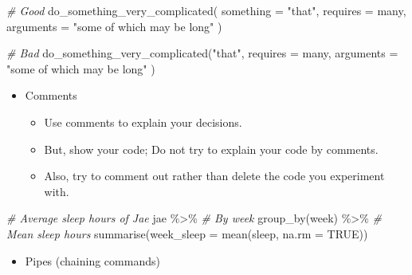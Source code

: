 \documentclass[
]{book}
\newenvironment{Shaded}{\begin{snugshade}}{\end{snugshade}}
\newcommand{\AttributeTok}[1]{\textcolor[rgb]{0.77,0.63,0.00}{#1}}
\newcommand{\CommentTok}[1]{\textcolor[rgb]{0.56,0.35,0.01}{\textit{#1}}}
\newcommand{\ConstantTok}[1]{\textcolor[rgb]{0.00,0.00,0.00}{#1}}
\newcommand{\FunctionTok}[1]{\textcolor[rgb]{0.00,0.00,0.00}{#1}}
\newcommand{\NormalTok}[1]{#1}
\newcommand{\SpecialCharTok}[1]{\textcolor[rgb]{0.00,0.00,0.00}{#1}}
\newcommand{\StringTok}[1]{\textcolor[rgb]{0.31,0.60,0.02}{#1}}
\providecommand{\tightlist}{%
  \setlength{\itemsep}{0pt}\setlength{\parskip}{0pt}}
\begin{document}
\begin{Shaded}
\begin{Highlighting}[]
\CommentTok{\# Good}
\FunctionTok{do\_something\_very\_complicated}\NormalTok{(}
  \AttributeTok{something =} \StringTok{"that"}\NormalTok{,}
  \AttributeTok{requires =}\NormalTok{ many,}
  \AttributeTok{arguments =} \StringTok{"some of which may be long"}
\NormalTok{)}

\CommentTok{\# Bad}
\FunctionTok{do\_something\_very\_complicated}\NormalTok{(}\StringTok{"that"}\NormalTok{, }\AttributeTok{requires =}\NormalTok{ many, }\AttributeTok{arguments =}
                              \StringTok{"some of which may be long"}
\NormalTok{                              )}
\end{Highlighting}
\end{Shaded}

\begin{itemize}
\tightlist
\item
  Comments

  \begin{itemize}
  \tightlist
  \item
    Use comments to explain your decisions.
  \item
    But, show your code; Do not try to explain your code by comments.
  \item
    Also, try to comment out rather than delete the code you experiment with.
  \end{itemize}
\end{itemize}

\begin{Shaded}
\begin{Highlighting}[]
\CommentTok{\# Average sleep hours of Jae}
\NormalTok{jae }\SpecialCharTok{\%\textgreater{}\%}
  \CommentTok{\# By week}
  \FunctionTok{group\_by}\NormalTok{(week) }\SpecialCharTok{\%\textgreater{}\%}
  \CommentTok{\# Mean sleep hours }
  \FunctionTok{summarise}\NormalTok{(}\AttributeTok{week\_sleep =} \FunctionTok{mean}\NormalTok{(sleep, }\AttributeTok{na.rm =} \ConstantTok{TRUE}\NormalTok{))}
\end{Highlighting}
\end{Shaded}

\begin{itemize}
\tightlist
\item
  Pipes (chaining commands)
\end{itemize}
\end{document}
